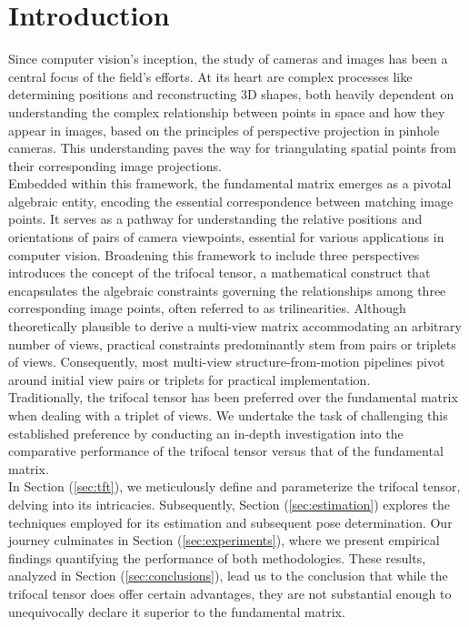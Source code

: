 \section{Introduction}\label{sec:intro}
Since computer vision's inception, the study of cameras and images has been a central focus of the field's efforts. At its heart are complex processes like determining positions and reconstructing 3D shapes, both heavily dependent on understanding the complex relationship between points in space and how they appear in images, based on the principles of perspective projection in pinhole cameras. This understanding paves the way for triangulating spatial points from their corresponding image projections.\\

Embedded within this framework, the fundamental matrix emerges as a pivotal algebraic entity, encoding the essential correspondence between matching image points. It serves as a pathway for understanding the relative positions and orientations of pairs of camera viewpoints, essential for various applications in computer vision. Broadening this framework to include three perspectives introduces the concept of the trifocal tensor, a mathematical construct that encapsulates the algebraic constraints governing the relationships among three corresponding image points, often referred to as trilinearities. Although theoretically plausible to derive a multi-view matrix accommodating an arbitrary number of views, practical constraints predominantly stem from pairs or triplets of views. Consequently, most multi-view structure-from-motion pipelines pivot around initial view pairs or triplets for practical implementation.\\

Traditionally, the trifocal tensor has been preferred over the fundamental matrix when dealing with a triplet of views. We undertake the task of challenging this established preference by conducting an in-depth investigation into the comparative performance of the trifocal tensor versus that of the fundamental matrix.\\

In Section (\ref{sec:tft}), we meticulously define and parameterize the trifocal tensor, delving into its intricacies. Subsequently, Section (\ref{sec:estimation}) explores the techniques employed for its estimation and subsequent pose determination. Our journey culminates in Section (\ref{sec:experiments}), where we present empirical findings quantifying the performance of both methodologies. These results, analyzed in Section (\ref{sec:conclusions}), lead us to the conclusion that while the trifocal tensor does offer certain advantages, they are not substantial enough to unequivocally declare it superior to the fundamental matrix.

